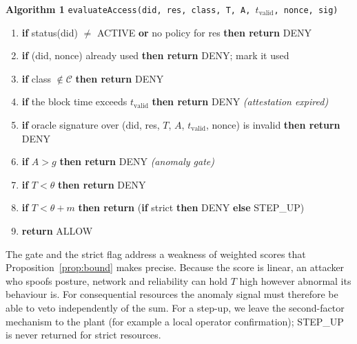\begin{center}
\begin{minipage}{\linewidth}
\small
\textbf{Algorithm 1} \texttt{evaluateAccess(did, res, class, T, A, $t_{\mathrm{valid}}$, nonce, sig)}
\begin{enumerate}[leftmargin=1.4em,itemsep=0pt,topsep=2pt]
  \item \textbf{if} status(did) $\ne$ ACTIVE \textbf{or} no policy for res \textbf{then return} DENY
  \item \textbf{if} (did, nonce) already used \textbf{then return} DENY; mark it used
  \item \textbf{if} class $\notin\mathcal{C}$ \textbf{then return} DENY
  \item \textbf{if} the block time exceeds $t_{\mathrm{valid}}$ \textbf{then return} DENY \hfill\textit{(attestation expired)}
  \item \textbf{if} oracle signature over (did, res, $T$, $A$, $t_{\mathrm{valid}}$, nonce) is invalid \textbf{then return} DENY
  \item \textbf{if} $A>g$ \textbf{then return} DENY \hfill\textit{(anomaly gate)}
  \item \textbf{if} $T<\theta$ \textbf{then return} DENY
  \item \textbf{if} $T<\theta+m$ \textbf{then return} (\textbf{if} strict \textbf{then} DENY \textbf{else} STEP\_UP)
  \item \textbf{return} ALLOW
\end{enumerate}
\end{minipage}
\end{center}

The gate and the strict flag address a weakness of weighted scores that Proposition~\ref{prop:bound} makes precise. Because the score is linear, an attacker who spoofs posture, network and reliability can hold $T$ high however abnormal its behaviour is. For consequential resources the anomaly signal must therefore be able to veto independently of the sum. For a step-up, we leave the second-factor mechanism to the plant (for example a local operator confirmation); STEP\_UP is never returned for strict resources.

